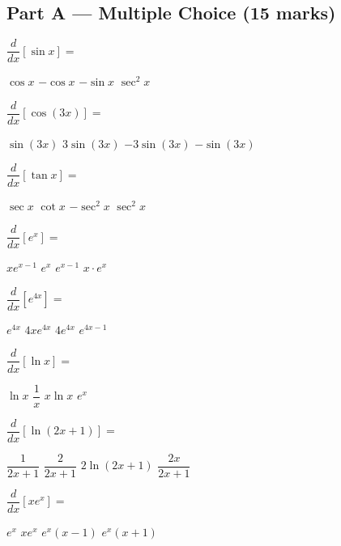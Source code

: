 \documentclass[addpoints]{exam}
\begin{document}
\newpage
\begin{questions}

\section*{Part A --- Multiple Choice (15 marks)}
\vspace{5mm}

\question[1] $\dfrac{d}{dx}\!\left[\sin x\right] = $
\begin{choices}
    \correctchoice $\cos x$
    \choice $-\cos x$
    \choice $-\sin x$
    \choice $\sec^2 x$
\end{choices}

\question[1] $\dfrac{d}{dx}\!\left[\cos(3x)\right] = $
\begin{choices}
    \choice $\sin(3x)$
    \choice $3\sin(3x)$
    \correctchoice $-3\sin(3x)$
    \choice $-\sin(3x)$
\end{choices}

\question[1] $\dfrac{d}{dx}\!\left[\tan x\right] = $
\begin{choices}
    \choice $\sec x$
    \choice $\cot x$
    \choice $-\sec^2 x$
    \correctchoice $\sec^2 x$
\end{choices}

\question[1] $\dfrac{d}{dx}\!\left[e^x\right] = $
\begin{choices}
    \choice $xe^{x-1}$
    \correctchoice $e^x$
    \choice $e^{x-1}$
    \choice $x \cdot e^x$
\end{choices}

\question[1] $\dfrac{d}{dx}\!\left[e^{4x}\right] = $
\begin{choices}
    \choice $e^{4x}$
    \choice $4xe^{4x}$
    \correctchoice $4e^{4x}$
    \choice $e^{4x-1}$
\end{choices}

\question[1] $\dfrac{d}{dx}\!\left[\ln x\right] = $
\begin{choices}
    \choice $\ln x$
    \correctchoice $\dfrac{1}{x}$
    \choice $x \ln x$
    \choice $e^x$
\end{choices}

\question[1] $\dfrac{d}{dx}\!\left[\ln(2x + 1)\right] = $
\begin{choices}
    \choice $\dfrac{1}{2x+1}$
    \correctchoice $\dfrac{2}{2x+1}$
    \choice $2\ln(2x+1)$
    \choice $\dfrac{2x}{2x+1}$
\end{choices}

\question[1] $\dfrac{d}{dx}\!\left[x e^x\right] = $
\begin{choices}
    \choice $e^x$
    \choice $xe^x$
    \choice $e^x(x - 1)$
    \correctchoice $e^x(x + 1)$
\end{choices}


\end{questions}
\end{document}
